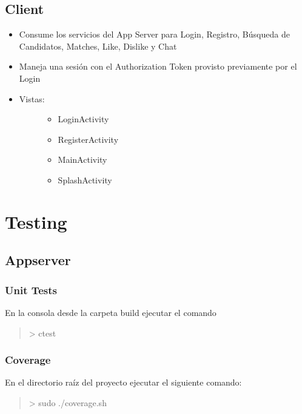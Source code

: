 \documentclass[letterpaper,10pt,english]{sphinxmanual}
\begin{document}
\subsection{Client}
\label{manuals:client}\begin{itemize}
\item {} 
Consume los servicios del App Server para Login, Registro, Búsqueda de Candidatos, Matches, Like, Dislike y Chat

\item {} 
Maneja una sesión con el Authorization Token provisto previamente por el Login

\item {} \begin{description}
\item[{Vistas:}] \leavevmode\begin{itemize}
\item {} 
LoginActivity

\item {} 
RegisterActivity

\item {} 
MainActivity

\item {} 
SplashActivity

\end{itemize}

\end{description}

\end{itemize}


\section{Testing}
\label{manuals:testing}

\subsection{Appserver}
\label{manuals:id2}

\subsubsection{Unit Tests}
\label{manuals:unit-tests}
En la consola desde la carpeta build ejecutar el comando
\begin{quote}

\textgreater{} ctest
\end{quote}


\subsubsection{Coverage}
\label{manuals:coverage}
En el directorio raíz del proyecto ejecutar el siguiente comando:
\begin{quote}

\textgreater{} sudo ./coverage.sh
\end{quote}
\end{document}
